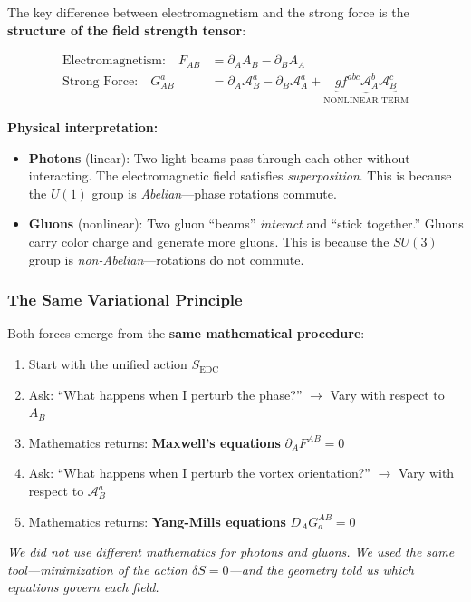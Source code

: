 The key difference between electromagnetism and the strong force is the \textbf{structure of the field strength tensor}:

\begin{align}
\text{Electromagnetism:} \quad F_{AB} &= \partial_A A_B - \partial_B A_A \\[1em]
\text{Strong Force:} \quad G^a_{AB} &= \partial_A \mathcal{A}^a_B - \partial_B \mathcal{A}^a_A + \underbrace{g f^{abc} \mathcal{A}^b_A \mathcal{A}^c_B}_{\text{NONLINEAR TERM}}
\end{align}

\textbf{Physical interpretation:}

\begin{itemize}
    \item \textbf{Photons} (linear): Two light beams pass through each other without interacting. The electromagnetic field satisfies \textit{superposition}. This is because the $U(1)$ group is \textit{Abelian}---phase rotations commute.
    
    \item \textbf{Gluons} (nonlinear): Two gluon ``beams'' \textit{interact} and ``stick together.'' Gluons carry color charge and generate more gluons. This is because the $SU(3)$ group is \textit{non-Abelian}---rotations do not commute.
\end{itemize}

\subsubsection{The Same Variational Principle}

Both forces emerge from the \textbf{same mathematical procedure}:

\begin{enumerate}
    \item Start with the unified action $S_{\text{EDC}}$
    \item Ask: ``What happens when I perturb the phase?'' $\to$ Vary with respect to $A_B$
    \item Mathematics returns: \textbf{Maxwell's equations} $\partial_A F^{AB} = 0$
    \item Ask: ``What happens when I perturb the vortex orientation?'' $\to$ Vary with respect to $\mathcal{A}^a_B$
    \item Mathematics returns: \textbf{Yang-Mills equations} $D_A G^{AB}_a = 0$
\end{enumerate}

\textit{We did not use different mathematics for photons and gluons. We used the same tool---minimization of the action $\delta S = 0$---and the geometry told us which equations govern each field.}

